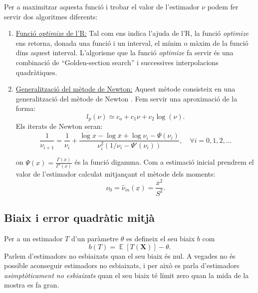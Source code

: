 \documentclass[12pt, catalan]{article}
\numberwithin{table}{section}
\numberwithin{figure}{section}
\numberwithin{equation}{section}
\DeclareMathOperator{\E}{\mathbb{E}}
\begin{document}
Per a maximitzar aquesta funció i trobar el valor de l'estimador $\nu$ podem fer servir dos algoritmes diferents:
\begin{enumerate}
  \item  \underline{Funció \textit{optimize} de l'R:}
  Tal com ens indica l'ajuda de l'R\cite{Rhelp}, la funció \textit{optimize} ens retorna, donada una funció i un interval, el mínim o màxim de la funció dins aquest interval. L'algorisme que la funció \textit{optimize} fa servir és una combinació de ``Golden-section search'' i successives interpolacions quadràtiques.

  
  \item  \underline{Generalització del mètode de Newton:}
  Aquest mètode consisteix en una generalització del mètode de Newton \cite{method}.
  Fem servir una aproximació de la forma:
  \begin{equation}
       l_p(\nu)\simeq c_o+c_1\nu+c_2\log(\nu).
  \end{equation}
  Els iterats de Newton seran:
  \begin{equation}
      \frac{1}{\nu_{i+1}}=\frac{1}{\nu_i}+\frac{\overline{\log x}-\log\overline{x}+\log\nu_i-\Psi(\nu_i)}{\nu_i^2(1/\nu_i-\Psi'(\nu_i))},\quad\forall i=0,1,2,...
      \label{Newton}
  \end{equation}

 on $\Psi(x)=\frac{\Gamma(x)}{\Gamma'(x)}$ és la funció digamma.
 Com a estimació inicial prendrem el valor de l'estimador calculat mitjançant el mètode dels moments: %
 \begin{equation*}
     \nu_0=\hat{\nu}_m(\underline{x})=\frac{\overline{x}^2}{S^2}.
 \end{equation*}
\end{enumerate}


\subsection{Biaix i error quadràtic mitjà}
Per a un estimador $T$ d'un paràmetre $\theta$ es defineix el seu biaix $b$ com
\begin{equation*}
    b(T) = \E{[T(\mathbf{X})]}-\theta.
\end{equation*}
Parlem d'estimadors no esbiaixats quan el seu biaix és nul. A vegades no és possible aconseguir estimadors no esbiaixats, i per això es parla d'estimadors \emph{asimptòticament no esbiaixats} quan el seu biaix té límit zero quan la mida de la mostra es fa gran.
\end{document}
